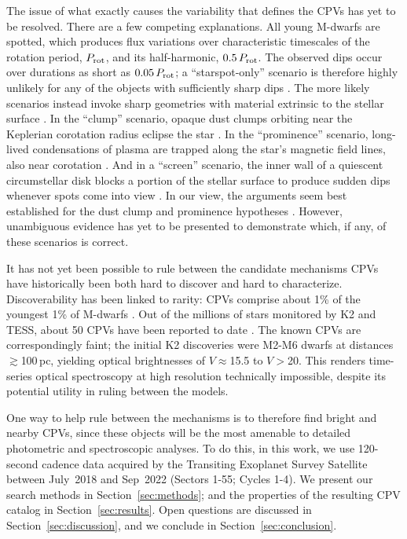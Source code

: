 \documentclass[11pt,twocolumn,tighten]{aastex63}
\begin{document}
The issue of what exactly causes the variability that defines the CPVs
has yet to be resolved.  There are a few competing explanations.  All
young M-dwarfs are spotted, which produces flux variations over
characteristic timescales of the rotation period, $P_{\rm rot}$, and
its half-harmonic, $0.5\,P_{\rm rot}$.  The observed dips occur over
durations as short as $0.05\,P_{\rm rot}$; a ``starspot-only''
scenario is therefore highly unlikely for any of the objects with
sufficiently sharp dips
\citep{2017AJ....153..152S,2021MNRAS.500.1366K}.   The more likely
scenarios instead invoke sharp geometries with material extrinsic to
the stellar surface \citep[see
Refs.~][]{2017AJ....153..152S,2022AJ....163..144G}.  In the ``clump''
scenario, opaque dust clumps orbiting near the Keplerian corotation
radius eclipse the star
\citep{2017AJ....153..152S,2023MNRAS.518.4734S}.  In the
``prominence'' scenario, long-lived condensations of plasma are
trapped along the star’s magnetic field lines, also near corotation
\citep{2022MNRAS.514.5465W}.  And in a ``screen'' scenario, the inner
wall of a quiescent circumstellar disk blocks a portion of the stellar
surface to produce sudden dips whenever spots come into view
\citep{2019ApJ...876..127Z}.  In our view, the arguments seem best
established for the dust clump and prominence hypotheses
\citep{2023MNRAS.518.4734S,2022MNRAS.514.5465W}.  However, unambiguous
evidence has yet to be presented to demonstrate which, if any, of
these scenarios is correct.

It has not yet been possible to rule between the candidate mechanisms
CPVs have historically been both hard to discover and hard
to characterize.   Discoverability has been linked to rarity: 
CPVs comprise about 1\% of the youngest 1\% of M-dwarfs
\citep{2018AJ....155..196R}.  Out of the millions of stars monitored
by K2 and TESS, about 50 CPVs have been reported to date
\citep{2017AJ....153..152S,2018AJ....155...63S,2019ApJ...876..127Z,2022AJ....163..144G,2023ApJ...945..114P}.
The known CPVs are correspondingly faint; the initial K2 discoveries
\citep{2017AJ....153..152S} were M2-M6 dwarfs at distances
$\gtrsim$100\,pc, yielding optical brightnesses of $V$$\approx$15.5 to
$V$$>$20.  This renders time-series optical spectroscopy at high
resolution technically impossible, despite its potential utility in
ruling between the models.

One way to help rule between the mechanisms is to therefore find
bright and nearby CPVs, since these objects will be the most amenable
to detailed photometric and spectroscopic analyses.  To do this, in
this work, we use 120-second cadence data acquired by the Transiting
Exoplanet Survey Satellite between July~2018 and Sep~2022 (Sectors
1-55; Cycles 1-4).  We present our search methods in
Section~\ref{sec:methods}; and the properties of the resulting CPV
catalog in Section~\ref{sec:results}.  Open questions are discussed in
Section~\ref{sec:discussion}, and we conclude in
Section~\ref{sec:conclusion}.
\end{document}
